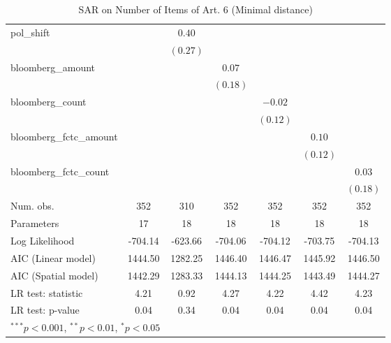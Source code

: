 \begin{table}[!h]
\begin{center}
\begin{tabular}{l c c c c c c }
pol\_shift              &              & $0.40$       &              &              &              &              \\
                        &              & $(0.27)$     &              &              &              &              \\
bloomberg\_amount       &              &              & $0.07$       &              &              &              \\
                        &              &              & $(0.18)$     &              &              &              \\
bloomberg\_count        &              &              &              & $-0.02$      &              &              \\
                        &              &              &              & $(0.12)$     &              &              \\
bloomberg\_fctc\_amount &              &              &              &              & $0.10$       &              \\
                        &              &              &              &              & $(0.12)$     &              \\
bloomberg\_fctc\_count  &              &              &              &              &              & $0.03$       \\
                        &              &              &              &              &              & $(0.18)$     \\
\midrule
Num. obs.               & 352          & 310          & 352          & 352          & 352          & 352          \\
Parameters              & 17           & 18           & 18           & 18           & 18           & 18           \\
Log Likelihood          & -704.14      & -623.66      & -704.06      & -704.12      & -703.75      & -704.13      \\
AIC (Linear model)      & 1444.50      & 1282.25      & 1446.40      & 1446.47      & 1445.92      & 1446.50      \\
AIC (Spatial model)     & 1442.29      & 1283.33      & 1444.13      & 1444.25      & 1443.49      & 1444.27      \\
LR test: statistic      & 4.21         & 0.92         & 4.27         & 4.22         & 4.42         & 4.23         \\
LR test: p-value        & 0.04         & 0.34         & 0.04         & 0.04         & 0.04         & 0.04         \\
\bottomrule
\multicolumn{7}{l}{\scriptsize{$^{***}p<0.001$, $^{**}p<0.01$, $^*p<0.05$}}
\end{tabular}
\caption{SAR on Number of Items of Art. 6 (Minimal distance)}
\label{table:coefficients}
\end{center}
\end{table}
